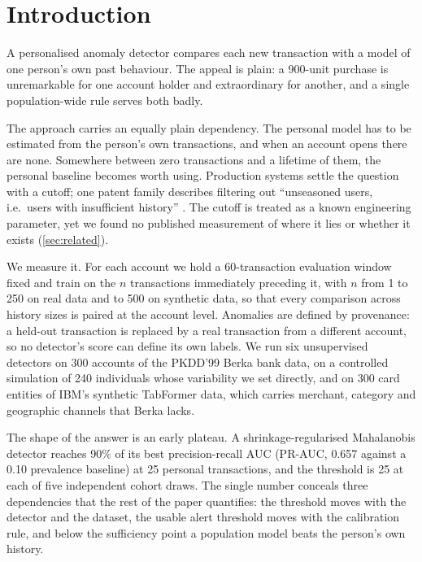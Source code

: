 \section{Introduction}\label{sec:intro}

A personalised anomaly detector compares each new transaction with a model of one person's own past behaviour. The appeal is plain: a 900-unit purchase is unremarkable for one account holder and extraordinary for another, and a single population-wide rule serves both badly.

The approach carries an equally plain dependency. The personal model has to be estimated from the person's own transactions, and when an account opens there are none. Somewhere between zero transactions and a lifetime of them, the personal baseline becomes worth using. Production systems settle the question with a cutoff; one patent family describes filtering out ``unseasoned users, i.e.\ users with insufficient history'' \cite{faigon2021anomaly}. The cutoff is treated as a known engineering parameter, yet we found no published measurement of where it lies or whether it exists (\cref{sec:related}).

We measure it. For each account we hold a 60-transaction evaluation window fixed and train on the $n$ transactions immediately preceding it, with $n$ from 1 to 250 on real data and to 500 on synthetic data, so that every comparison across history sizes is paired at the account level. Anomalies are defined by provenance: a held-out transaction is replaced by a real transaction from a different account, so no detector's score can define its own labels. We run six unsupervised detectors on 300 accounts of the PKDD'99 Berka bank data, on a controlled simulation of 240 individuals whose variability we set directly, and on 300 card entities of IBM's synthetic TabFormer data, which carries merchant, category and geographic channels that Berka lacks.

The shape of the answer is an early plateau. A shrinkage-regularised Mahalanobis detector reaches 90\% of its best precision-recall AUC (PR-AUC, 0.657 against a 0.10 prevalence baseline) at 25 personal transactions, and the threshold is 25 at each of five independent cohort draws. The single number conceals three dependencies that the rest of the paper quantifies: the threshold moves with the detector and the dataset, the usable alert threshold moves with the calibration rule, and below the sufficiency point a population model beats the person's own history.

